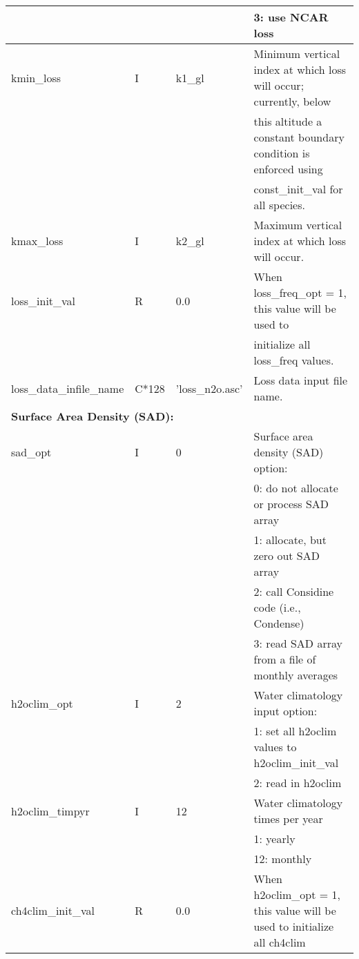 {\begin{landscape}
\begin{center}
\begin{longtable}{|l|l|l|l|}
                 &   &   &                            3:  use NCAR loss  \\ \hline
kmin\_loss       & I & k1\_gl & Minimum vertical index at which loss will occur; currently, below  \\
                 &   &   &      this altitude a constant boundary condition is enforced using  \\
                 &   &   &      const\_init\_val for all species.  \\ \hline
kmax\_loss       & I & k2\_gl & Maximum vertical index at which loss will occur.  \\ \hline
loss\_init\_val   & R &  0.0  & When loss\_freq\_opt = 1, this value will be used to  \\ 
                  &   &       & initialize all loss\_freq values.  \\ \hline
loss\_data\_infile\_name   & C*128 & 'loss\_n2o.asc' & Loss data input file name.  \\ \hline
\multicolumn{4}{|l|}{\bf Surface Area Density (SAD):} \\ \hline
sad\_opt             & I & 0 & Surface area density (SAD) option:  \\
                 &   &   &                              0:  do not allocate or process SAD array  \\
                 &   &   &                              1:  allocate, but zero out SAD array  \\
                 &   &   &                              2:  call Considine code (i.e., Condense)  \\
                 &   &   &                              3:  read SAD array from a file of monthly averages  \\ \hline
h2oclim\_opt         & I & 2 & Water climatology input option:  \\
                 &   &   &                              1:  set all h2oclim values to h2oclim\_init\_val  \\
                 &   &   &                              2:  read in h2oclim  \\ \hline 
h2oclim\_timpyr      & I & 12 & Water climatology times per year  \\
                 &   &   &                              1:  yearly  \\
                 &   &   &                             12:  monthly  \\ \hline
ch4clim\_init\_val    & R & 0.0 & When h2oclim\_opt = 1, this value will be used to initialize all ch4clim  \\ \hline

\end{longtable}
\end{center}
\end{landscape}}
